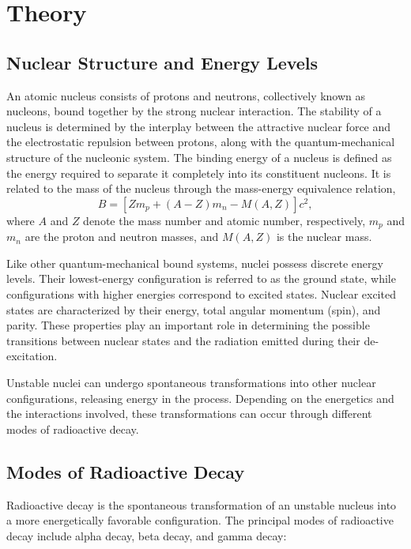 \section{Theory}
\subsection{Nuclear Structure and Energy Levels}
An atomic nucleus consists of protons and neutrons, collectively known as nucleons, bound together by the strong nuclear interaction. The stability of a nucleus is determined by the interplay between the attractive nuclear force and the electrostatic repulsion between protons, along with the quantum-mechanical structure of the nucleonic system. The binding energy of a nucleus is defined as the energy required to separate it completely into its constituent nucleons. It is related to the mass of the nucleus through the mass-energy equivalence relation,
\begin{equation}
    B = \left[ Zm_p + (A-Z)m_n - M(A,Z) \right]c^2,
\end{equation}
where $A$ and $Z$ denote the mass number and atomic number, respectively, $m_p$ and $m_n$ are the proton and neutron masses, and $M(A,Z)$ is the nuclear mass.

Like other quantum-mechanical bound systems, nuclei possess discrete energy levels. Their lowest-energy configuration is referred to as the ground state, while configurations with higher energies correspond to excited states. Nuclear excited states are characterized by their energy, total angular momentum (spin), and parity. These properties play an important role in determining the possible transitions between nuclear states and the radiation emitted during their de-excitation.

Unstable nuclei can undergo spontaneous transformations into other nuclear configurations, releasing energy in the process. Depending on the energetics and the interactions involved, these transformations can occur through different modes of radioactive decay.

\subsection{Modes of Radioactive Decay}

Radioactive decay is the spontaneous transformation of an unstable nucleus into a more energetically favorable configuration. The principal modes of radioactive decay include alpha decay, beta decay, and gamma decay:

